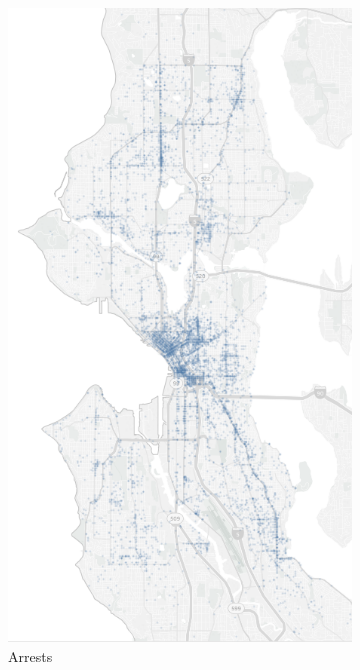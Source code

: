 \begin{figure}[h] 
    \begin{subfigure}{0.5\textwidth}
        \includegraphics[width=0.9\linewidth]{figures/1_2_geographical_distribution_arrests} 
        \caption{Arrests}
        \label{fig:1_2_arrests}
    \end{subfigure}
    \begin{subfigure}{0.5\textwidth}

\end{subfigure}
\end{figure}
